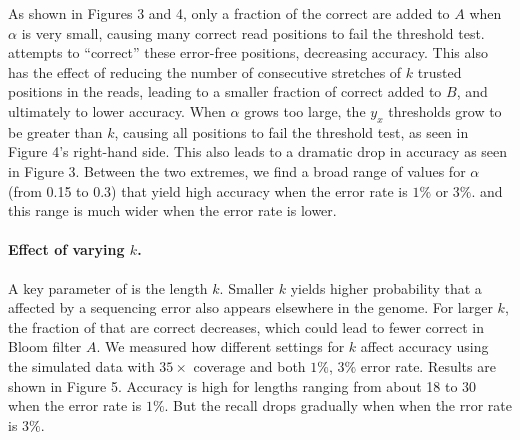 \documentclass{bmcart}
\begin{document}


As shown in Figures 3 and 4, only a fraction of the correct \kmers are added to $A$ when $\alpha$ is very small, causing many correct read positions to fail the threshold test.  \tool attempts to ``correct'' these error-free positions, decreasing accuracy.  This also has the effect of reducing the number of consecutive stretches of $k$ trusted positions in the reads, leading to a smaller fraction of correct \kmers added to $B$, and ultimately to lower accuracy.  When $\alpha$ grows too large, the $y_x$ thresholds grow to be greater than $k$, causing all positions to fail the threshold test, as seen in Figure 4's right-hand side.  This also leads to a dramatic drop in accuracy as seen in Figure 3.  Between the two extremes, we find a broad range of values for $\alpha$ (from 0.15 to 0.3) that yield high accuracy when the error rate is $1\%$ or $3\%$. and this range is much wider when the error rate is lower.







\paragraph{Effect of varying $k$.}  
A key parameter of \tool is the \kmer length $k$.  Smaller $k$ yields higher probability that a \kmer affected by a sequencing error also appears elsewhere in the genome.  For larger $k$, the fraction of \kmers that are correct decreases, which could lead to fewer correct \kmer in Bloom filter $A$.  We measured how different settings for $k$ affect accuracy using the simulated data with $35\times$ coverage and both $1\%$, $3\%$ error rate.  Results are shown in Figure 5.  Accuracy is high for \kmer lengths ranging from about 18 to 30 when the error rate is $1\%$. But the recall drops gradually when when the rror rate is $3\%$. 
\end{document}

